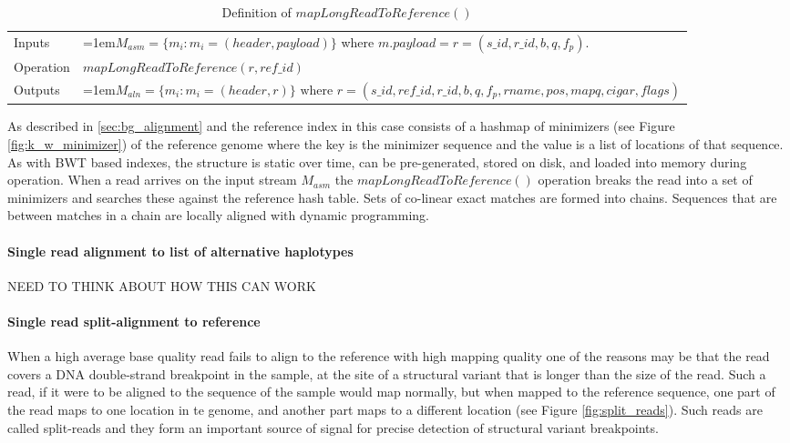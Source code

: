 \bgroup
\def\arraystretch{1.5}
\begin{table}[!ht]
    \caption{Definition of $mapLongReadToReference()$}
    \label{tab:op_map_long_read_to_reference}
    {\begin{tabular}{l|p{12cm}}
    \toprule
    Inputs & \hangindent=1em$M_{asm} = \{m_i: m_i = (header, payload)\}$ where $m.payload = r = (s\_id, r\_id, b, q, f_p)$. \\
    \cline{2-2}
    Operation & $mapLongReadToReference(r, ref\_id)$\\
    \cline{2-2}
    Outputs & \hangindent=1em$M_{aln} = \{m_i: m_i = (header, r)\} \text{ where } r = (s\_id, ref\_id, r\_id, b, q, f_p, rname, pos, mapq, cigar, flags)$\\
    \bottomrule
    \end{tabular}}
\end{table}
\egroup

As described in \ref{sec:bg_alignment} and \autocite{li2018minimap2} the reference index in this case consists of a hashmap of minimizers (see Figure \ref{fig:k_w_minimizer}) of the reference genome where the key is the minimizer sequence and the value is a list of locations of that sequence. As with BWT based indexes, the structure is static over time, can be pre-generated, stored on disk, and loaded into memory during operation. When a read arrives on the input stream $M_{asm}$ the $mapLongReadToReference()$ operation breaks the read into a set of minimizers and searches these against the reference hash table. Sets of co-linear exact matches are formed into chains. Sequences that are between matches in a chain are locally aligned with dynamic programming. 

\paragraph{Single read alignment to list of alternative haplotypes}
NEED TO THINK ABOUT HOW THIS CAN WORK


\paragraph{Single read split-alignment to reference}
When a high average base quality read fails to align to the reference with high mapping quality one of the reasons may be that the read covers a DNA double-strand breakpoint in the sample, at the site of a structural variant that is longer than the size of the read. Such a read, if it were to be aligned to the sequence of the sample would map normally, but when mapped to the reference sequence, one part of the read maps to one location in te genome, and another part maps to a different location (see Figure \ref{fig:split_reads}). Such reads are called split-reads and they form an important source of signal for precise detection of structural variant breakpoints\autocites{rausch2012delly}{layer2014lumpy}.

